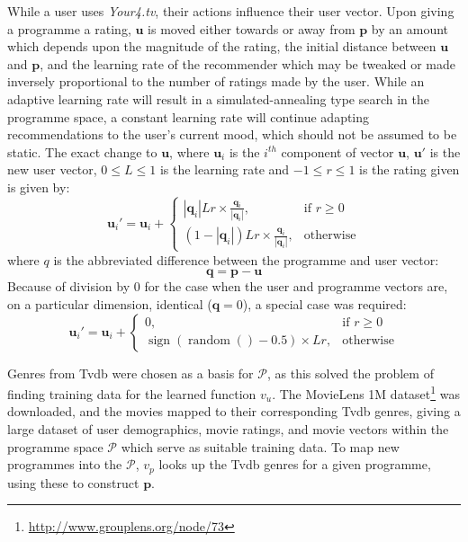 		While a user uses \textit{Your4.tv}, their actions influence their user vector. Upon giving a programme a rating, $\mathbf{u}$ is moved either towards or away from $\mathbf{p}$ by an amount which depends upon the magnitude of the rating, the initial distance between $\mathbf{u}$ and $\mathbf{p}$, and the learning rate of the recommender which may be tweaked or made inversely proportional to the number of ratings made by the user. While an adaptive learning rate will result in a simulated-annealing type search in the programme space, a constant learning rate will continue adapting recommendations to the user's current mood, which should not be assumed to be static. The exact change to $\mathbf{u}$, where $\mathbf{u}_{i}$ is the $i^{th}$ component of vector $\mathbf{u}$, $\mathbf{u}'$ is the new user vector, $0 \leq L \leq 1$ is the learning rate and $-1 \leq r \leq 1$ is the rating given is given by:
		$$
			\mathbf{u}_{i}' =
			\mathbf{u}_{i} + \begin{cases}
				\left|\mathbf{q}_i\right|Lr \times \frac{\mathbf{q}_i}{\left|\mathbf{q}_i\right|},&
					\text{if } r\geq 0\\
				(1-\left|\mathbf{q}_i\right|)Lr \times \frac{\mathbf{q}_i}{\left|\mathbf{q}_i\right|},&
					\text{otherwise}
			\end{cases}
		$$
		where $q$ is the abbreviated difference between the programme and user vector:
		$$
			\mathbf{q} = \mathbf{p}-\mathbf{u}
		$$
		Because of division by 0 for the case when the user and programme vectors are, on a particular dimension, identical ($\mathbf{q}=0$), a special case was required:
		$$
			\mathbf{u}_{i}' =
			\mathbf{u}_{i} + \begin{cases}
				0,&
					\text{if } r\geq 0\\
				\operatorname{sign}(\operatorname{random}()-0.5)\times Lr,&
					\text{otherwise}
			\end{cases}
		$$

		Genres from Tvdb were chosen as a basis for $\mathcal{P}$, as this solved the problem of finding training data for the learned function $v_u$. The MovieLens 1M dataset\footnote{\url{http://www.grouplens.org/node/73}} was downloaded, and the movies mapped to their corresponding Tvdb genres, giving a large dataset of user demographics, movie ratings, and movie vectors within the programme space $\mathcal{P}$ which serve as suitable training data. To map new programmes into the $\mathcal{P}$, $v_p$ looks up the Tvdb genres for a given programme, using these to construct $\mathbf{p}$.

